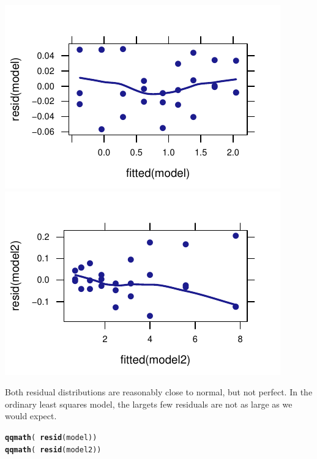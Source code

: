 \documentclass[twoside]{book}\usepackage[]{graphicx}\usepackage[]{xcolor}
\makeatletter
\def\maxwidth{ %
  \ifdim\Gin@nat@width>\linewidth
    \linewidth
  \else
    \Gin@nat@width
  \fi
}
\newcommand{\hlopt}[1]{\textcolor[rgb]{0,0,0}{#1}}%
\newcommand{\hlstd}[1]{\textcolor[rgb]{0.345,0.345,0.345}{#1}}%
\newcommand{\hlkwd}[1]{\textcolor[rgb]{0.737,0.353,0.396}{\textbf{#1}}}%
\newenvironment{kframe}{%
 \def\at@end@of@kframe{}%
 \ifinner\ifhmode%
  \def\at@end@of@kframe{\end{minipage}}%
  \begin{minipage}{\columnwidth}%
 \fi\fi%
 \def\FrameCommand##1{\hskip\@totalleftmargin \hskip-\fboxsep
 \colorbox{shadecolor}{##1}\hskip-\fboxsep
     \hskip-\linewidth \hskip-\@totalleftmargin \hskip\columnwidth}%
 \MakeFramed {\advance\hsize-\width
   \@totalleftmargin\z@ \linewidth\hsize
   \@setminipage}}%
 {\par\unskip\endMakeFramed%
 \at@end@of@kframe}
\newenvironment{knitrout}{}{} %
\makeatother
\begin{document}
\begin{solution}
\begin{knitrout}
{\centering \includegraphics[width=\maxwidth]{figures/fig-unnamed-chunk-212-1} 
\includegraphics[width=\maxwidth]{figures/fig-unnamed-chunk-212-2} 

}



\end{knitrout}
	Both residual distributions are reasonably close to normal, but not perfect.
	In the ordinary least squares model, the largets few residuals are not as large
	as we would expect.
\begin{knitrout}
\color{fgcolor}\begin{kframe}
\begin{alltt}
\hlkwd{qqmath}\hlstd{(}\hlopt{~}\hlkwd{resid}\hlstd{(model))}
\hlkwd{qqmath}\hlstd{(}\hlopt{~}\hlkwd{resid}\hlstd{(model2))}
\end{alltt}
\end{kframe}


\end{knitrout}
\end{solution}
\end{document}
